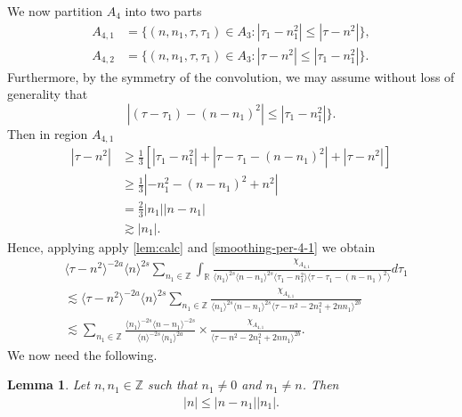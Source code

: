 \documentclass[12pt,reqno]{amsart}
\numberwithin{equation}{section}  %
\numberwithin{figure}{section}
\newcommand{\rr}{\mathbb{R}}
\newcommand{\zz}{\mathbb{Z}}
\theoremstyle{plain}
\newtheorem{lemma}{Lemma}
\theoremstyle{definition}
\theoremstyle{remark}
\begin{document}
%
%
We now 
partition $ A_{4}$ into two parts
\begin{align*}
A_{4,1}&=\{(n, n_1, \tau, \tau_1)\in A_3: |\tau_1-n_1^2|\leq|\tau-n^2|\},\\
A_{4,2}&=\{(n, n_1, \tau, \tau_1)\in A_3: |\tau-n^2|\leq|\tau_1-n_1^2| \}.
\end{align*} 
Furthermore, by the symmetry of the convolution, we may assume without loss of
generality that
$$|(\tau-\tau_1)-(n-n_1)^2|\leq|\tau_1-n_1^2|\}.$$
Then in region $A_{4,1}$
\begin{equation}
\begin{split}
  | \tau - n^{2} |
  & \ge \frac{1}{3}\left[ | \tau_{1} - n_{1}^{2} | + | \tau -
  \tau_{1} - (n - n_{1})^{2}
  | + | \tau - n^{2} | \right]
  \\
  & \ge \frac{1}{3} | - n_{1}^{2} - (n - n_{1})^{2} + n^{2} |
  \\
  & = \frac{2}{3} | n_{1} | | n - n_{1} |
  \\
  & \gtrsim | n_{1} |. 
\end{split}
\label{smoothing-per-4-1}
\end{equation}
%
%
Hence, applying apply \autoref{lem:calc} and \eqref{smoothing-per-4-1}
we obtain
%
%
%
%
\begin{equation}
  \label{region-a41}
\begin{split}
& \langle \tau - n^{2}  \rangle ^{-2a} \langle n
    \rangle ^{2s}
    \sum_{n_{1} \in \zz} \int_{\rr} \frac{\chi_{A_{4,1}}}{ \langle n_{1} \rangle ^{2s} \langle n-n_{1} \rangle ^{2s} 
\langle \tau_{1} - n_{1}^{2}  \rangle \langle  \tau - \tau_{1} - (n -
n_{1})^{2}  \rangle}
d \tau_1 
\\
& \lesssim \langle \tau - n^{2} \rangle ^{-2a} \langle n \rangle ^{2s}
\sum_{n_{1} \in
\zz}  \frac{\chi_{A_{4,1}}}{\langle n_{1} \rangle ^{2s} \langle n - n_{1} \rangle
^{2s} \langle \tau - n^{2} - 2n_{1}^{2} + 2nn_{1}  \rangle ^{2b}}
\\
& \lesssim 
\sum_{n_{1} \in
\zz}  \frac{\langle n_1 \rangle ^{-2s} \langle n - n_{1} \rangle ^{-2s}}{\langle
n \rangle ^{-2s} \langle n_{1} \rangle
^{2a}} \times \frac{\chi_{A_{4,1}}}{\langle \tau - n^{2} - 2n_{1}^{2} + 2nn_{1}
\rangle ^{2b}}.
\end{split}
\end{equation}
%
%
We now need the following. 
%
%
%
%
%
%
%
%
\begin{lemma}
  Let $n, n_1 \in \zz$ such that $n_{1} \neq 0$ and $n_{1} \neq n$.
  Then
  \begin{equation*}
  \begin{split}
    | n | \le | n - n_{1} | | n_{1} |.
  \end{split}
  \end{equation*}
\label{lem:integer-bound}
\end{lemma}
\end{document}

